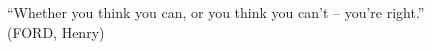 \begin{epigrafe}
	\vspace*{\fill}
	{%
		\noindent\hspace{.5\textwidth}
		{\begin{minipage}{.5\textwidth}
				\begin{flushright}
					``Whether you think you can, or you think you can't – you're right.'' \\ (FORD, Henry)
				\end{flushright}
			\end{minipage}}%
		\vspace*{3cm}
	}%
\end{epigrafe}
